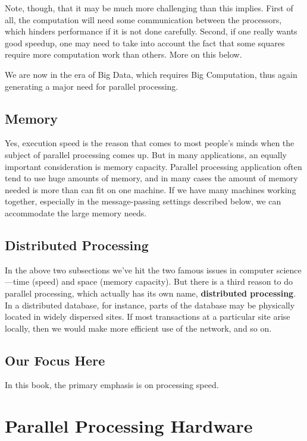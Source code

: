 Note, though, that it may be much more challenging than this implies.
First of all, the computation will need some communication between the
processors, which hinders performance if it is not done carefully.
Second, if one really wants good speedup, one may need to take into
account the fact that some squares require more computation work than
others.  More on this below.

We are now in the era of Big Data, which requires Big Computation, thus
again generating a major need for parallel processing.

\subsection{Memory}

Yes, execution speed is the reason that comes to most people's minds
when the subject of parallel processing comes up.  But in many
applications, an equally important consideration is memory capacity.
Parallel processing application often tend to use huge amounts of
memory, and in many cases the amount of memory needed is more than can
fit on one machine.  If we have many machines working together,
especially in the message-passing settings described below, we can
accommodate the large memory needs.

\subsection{Distributed Processing}

In the above two subsections we've hit the two famous issues in computer
science---time (speed) and space (memory capacity).  But there is a
third reason to do parallel processing, which actually has its own name,
{\bf distributed processing}.  In a distributed database, for instance,
parts of the database may be physically located in widely dispersed
sites.  If most transactions at a particular site arise locally, then
we would make more efficient use of the network, and so on.

\subsection{Our Focus Here}

In this book, the primary emphasis is on processing speed.

\section{Parallel Processing Hardware}

